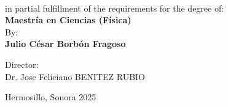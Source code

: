 %
%
%
%
%
%
%
%
%
%
%

%
%
%
%
%
%
%
%
%
%
%
%
%
%
%
\begin{minipage}[l][0.78\textheight][t]{0.1\textwidth}
    \begin{center}
    \hskip0pt
    \vrule width2.5pt height17cm    %
        \hskip1mm
        \vrule width1pt height17cm  %
        \end{center}
\end{minipage}
\begin{minipage}[c][0.78\textheight][t]{0.8\textwidth}
      \begin{center}
      \vspace{2cm}
        {\Large \scshape {}}

        \vspace{3cm}

          \\[20pt]
         in partial fulfillment of the
requirements for the degree of:\\[5pt]
        {\Large \textbf{{Maestr\'ia en Ciencias (F\'isica)}}}\\[40pt]
        By:\\[12pt]
        \textbf{  {\large Julio C\'esar Borb\'on Fragoso}}

        \vspace{2cm}

        { \large Director}:\\Dr. Jose Feliciano BENITEZ RUBIO

        \vspace{2.5cm}

        { Hermosillo, Sonora} \hskip2.5cm {2025}
      \end{center}
\end{minipage}
